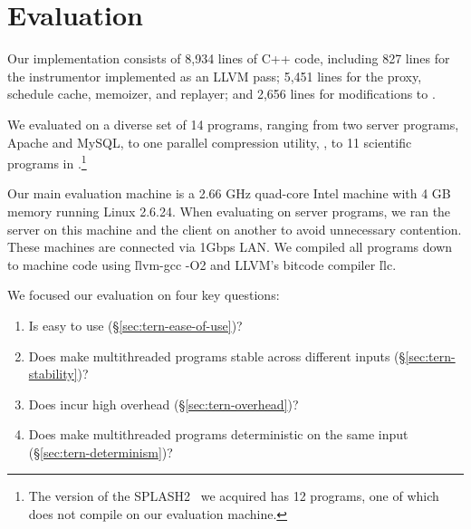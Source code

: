 \section{Evaluation}
\label{sec:tern-evaluation}

Our \tern implementation consists of 8,934 lines of C++ code, including 827
lines for the instrumentor implemented as an LLVM pass; 5,451 lines for
the proxy, schedule cache, memoizer, and replayer; and 2,656 lines for
modifications to \klee.

We evaluated \tern on a diverse set of 14 programs, ranging from two server
programs, Apache and MySQL, to one parallel compression utility, \pbzip, to
11 scientific programs in \splash.\footnote{The version of the
  SPLASH2~\cite{lu:bugbench} we acquired has 12 programs, one of which does
  not compile on our evaluation machine.}

Our main evaluation machine is a 2.66 GHz quad-core Intel machine with 4
GB memory running Linux 2.6.24.  When evaluating \tern on server programs, we
ran the server on this machine and the client on another to avoid
unnecessary contention.  These machines are connected via 1Gbps LAN.  We
compiled all programs down to machine code using \v{llvm-gcc -O2} and
LLVM's bitcode compiler \v{llc}.

We focused our evaluation on four key questions:
\begin{enumerate}

\item Is \tern easy to use (\S\ref{sec:tern-ease-of-use})?

\item Does \tern make multithreaded programs stable across different inputs
  (\S\ref{sec:tern-stability})?

\item Does \tern incur high overhead (\S\ref{sec:tern-overhead})?

\item Does \tern make multithreaded programs deterministic on the same
  input (\S\ref{sec:tern-determinism})?

\end{enumerate}





